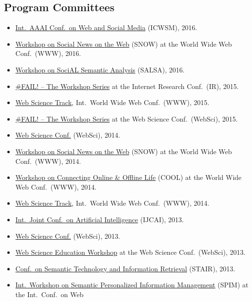 \documentclass[line,margin]{res}
\begin{document}
\begin{resume}
\section{Program Committees}
\begin{itemize}
\item \href{http://www.icwsm.org/2016/index.php}{Int.\ AAAI Conf.\ on
  Web and Social Media} (ICWSM), 2016.
\item \href{http://www.snow-workshop.org/}{Workshop on Social News on
  the Web} (SNOW) at the World Wide Web Conf.\ (WWW), 2016. 
\item \href{http://events.kmi.open.ac.uk/salsa2016/}{Workshop on SociAL
  Semantic Analysis} (SALSA), 2016.
\item \href{https://failworkshops.wordpress.com/fail-at-ir16/}{\#FAIL!
  -- The Workshop Series} at the Internet Research Conf.\ (IR), 2015.
\item \href{http://www.www2015.it/call-for-web-science-track/}{Web
  Science Track}, Int.\ World Wide Web Conf.\ (WWW), 2015.
\item \href{https://failworkshops.wordpress.com/fail-workshop-at-websci15/}{\#FAIL! -- The Workshop Series} at the Web Science Conf.\ (WebSci), 2015.
\item \href{http://www.websci14.org/}{Web Science Conf.} (WebSci),
  2014. 
\item \href{http://www.snow-workshop.org/}{Workshop on Social News on
  the Web} (SNOW) at the World Wide Web Conf.\ (WWW), 2014.
\item \href{http://www.cool2014.com/}{Workshop on Connecting Online \&
  Offline Life} (COOL) at the World Wide Web Conf.\ (WWW), 2014. 
\item \href{http://www2014.kr/calls/call-for-web-science-track/}{Web
  Science Track}, Int.\ World Wide Web Conf.\ (WWW), 2014.
\item \href{http://ijcai13.org/}{Int.\ Joint Conf.\ on Artificial
  Intelligence} (IJCAI), 2013.  
\item \href{http://www.websci13.org/}{Web Science Conf.} (WebSci), 2013. 
\item \href{http://webscience-education-workshop.blogs.usj.edu.lb/}{Web
  Science Education Workshop} at the Web Science Conf.\ (WebSci), 2013. 
\item \href{http://www.ftsm.ukm.my/stair13/}{Conf.\ on Semantic
  Technology and Information Retrieval} (STAIR), 2013. 
\item \href{http://spim-workshop.org/}{Int.\ Workshop on Semantic
  Personalized Information Management} (SPIM) at the Int.\ Conf.\ on Web

\end{itemize}
\end{resume}
\end{document}
